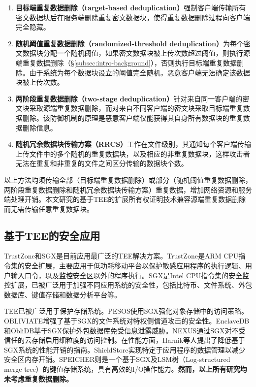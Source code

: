 \begin{enumerate}[leftmargin=*]
    \item \textbf{目标端重复数据删除（target-based deduplication）}\cite{harnik2010side}强制客户端传输所有密文数据块后在服务端删除重复密文数据块，使得重复数据删除过程向客户端完全隐藏。
    \item \textbf{随机阈值重复数据删除（randomized-threshold deduplication）}\cite{harnik2010side}为每个密文数据块分配一个随机阈值，如果密文数据块被上传次数超过阈值，则执行源端重复数据删除（\S\ref{subsec:intro-background}），否则执行目标端重复数据删除。由于系统为每个数据块设立的阈值完全随机，恶意客户端无法确定该数据块被上传次数。
    \item \textbf{两阶段重复数据删除（two-stage deduplication）}\cite{li2015cdstore}针对来自同一客户端的密文块采取源端重复数据删除，而对来自不同客户端的密文块采取目标端重复数据删除。该防御机制的原理是恶意客户端仅能获得其自身所有数据块的重复数据删除信息。
    \item \textbf{随机冗余数据块传输方案（RRCS）}\cite{zuo2018mitigating}工作在文件级别，其通知每个客户端传输上传文件中的多个随机的重复数据块，以及相应的非重复数据块，这样攻击者无法在重复和非重复的文件之间区分传输的数据块个数。 
\end{enumerate}

以上方法均须传输全部（目标端重复数据删除）或部分（随机阈值重复数据删除，两阶段重复数据删除和随机冗余数据块传输方案）重复数据，增加网络资源和服务端处理开销。本文研究的基于TEE的扩展所有权证明技术兼容源端重复数据删除而无需传输任意重复数据块。 

\subsection{基于TEE的安全应用}
\label{subsec:compare-tee}

TrustZone和SGX是目前应用最广泛的TEE解决方案\cite{pinto19}。TrustZone是ARM CPU指令集的安全扩展，主要应用于低功耗移动平台以保护敏感应用程序的执行逻辑\cite{rubinov2016automated}、用户输入口令\cite{ying2018truz}，以及监控安全区以外的程序执行\cite{azab2014hypervision}。SGX是Intel CPU指令集的安全监控扩展，已被广泛用于加强不同应用系统的安全性，包括比特币\cite{matetic19BITE}、文件系统\cite{ahmad2018OBLIVIATE,shinde20}、外包数据库\cite{eskandarian17,priebe18,sun21}、键值存储\cite{mishra2018Oblix,bailleu2019SPEICHER,kim2019ShieldStore,bailleu2021Avocado}和数据分析平台\cite{schuster15, zheng2017Opaque, bowe2020ZEXE}等。

TEE已被广泛用于保护存储系统。PESOS\cite{krahn2018PESOS}使用SGX强化对象存储中的访问策略。OBLIVIATE\cite{ahmad2018OBLIVIATE}增强了基于SGX的文件系统对特权侧信道攻击的安全性。EnclaveDB\cite{priebe18}和ObliDB\cite{eskandarian19}基于SGX保护外包数据库免受信息泄露威胁。NEXUS\cite{djoko2019NEXUS}通过SGX对不受信任的云存储启用细粒度的访问控制。在性能方面，Harnik等人\cite{harnik2018SGX}提出了降低基于SGX系统的性能开销的指南。ShieldStore\cite{kim2019ShieldStore}实现特定于应用程序的数据管理以减少安全区内存开销。SPEICHER\cite{bailleu2019SPEICHER}则是一个基于SGX及LSM树（Log-structured merge-tree）\cite{LSMT}的键值存储系统，具有高效的I/O操作能力。\textbf{然而，以上所有研究均未考虑重复数据删除。}

